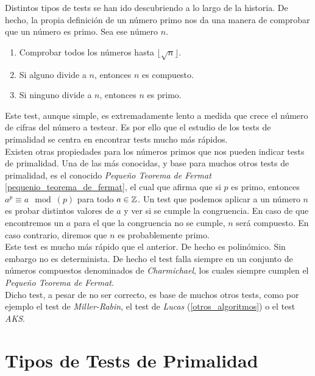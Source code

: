 Distintos tipos de tests se han ido descubriendo a lo largo de la historia. De hecho, la propia definición de un número primo nos da una manera de comprobar que un número es primo. Sea ese número $n$.

\begin{enumerate}
	\item Comprobar todos los números hasta $\lfloor\sqrt{n}\rfloor$.
	
	\item Si alguno divide a $n$, entonces $n$ es compuesto.
	
	\item Si ninguno divide a $n$, entonces $n$ es primo.
\end{enumerate}

Este test, aunque simple, es extremadamente lento a medida que crece el número de cifras del número a testear. Es por ello que el estudio de los tests de primalidad se centra en encontrar tests mucho más rápidos.\\

Existen otras propiedades para los números primos que nos pueden indicar tests de primalidad. Una de las más conocidas, y base para muchos otros tests de primalidad, es el conocido \textit{Pequeño Teorema de Fermat} \ref{pequenio_teorema_de_fermat}, el cual que afirma que si $p$ es primo, entonces $a^p \equiv a \mod(p)$ para todo $a \in \mathbb{Z}$. Un test que podemos aplicar a un número $n$ es probar distintos valores de $a$ y ver si se cumple la congruencia. En caso de que encontremos un $a$ para el que la congruencia no se cumple, $n$ será compuesto. En caso contrario, diremos que $n$ es probablemente primo.\\

Este test es mucho más rápido que el anterior. De hecho es polinómico. Sin embargo no es determinista. De hecho el test falla siempre en un conjunto de números compuestos denominados de \textit{Charmichael}, los cuales siempre cumplen el \textit{Pequeño Teorema de Fermat}.\\

Dicho test, a pesar de no ser correcto, es base de muchos otros tests, como por ejemplo el test de \textit{Miller-Rabin}, el test de \textit{Lucas} (\autoref{otros_algoritmos}) o el test \textit{AKS}.

\section{Tipos de Tests de Primalidad}

